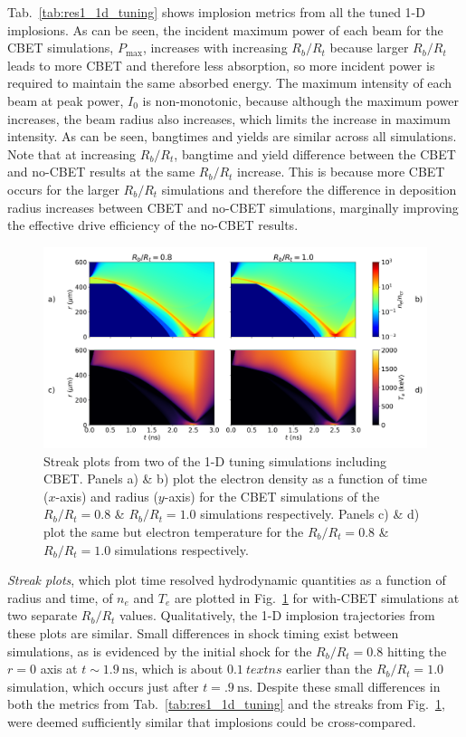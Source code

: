 Tab.~\ref{tab:res1_1d_tuning} shows implosion metrics from all the tuned 1-D implosions.
As can be seen, the incident maximum power of each beam for the \ac{CBET} simulations, $P_{\text{max}}$, increases with increasing $R_b/R_t$ because larger $R_b/R_t$ leads to more \ac{CBET} and therefore less absorption, so more incident power is required to maintain the same absorbed energy.
The maximum intensity of each beam at peak power, $I_0$ is non-monotonic, because although the maximum power increases, the beam radius also increases, which limits the increase in maximum intensity.
As can be seen, bangtimes and yields are similar across all simulations.
Note that at increasing $R_b/R_t$, bangtime and yield difference between the \ac{CBET} and no-\ac{CBET} results at the same $R_b/R_t$ increase.
This is because more \ac{CBET} occurs for the larger $R_b/R_t$ simulations and therefore the difference in deposition radius increases between \ac{CBET} and no-\ac{CBET} simulations, marginally improving the effective drive efficiency of the no-\ac{CBET} results.

\begin{figure}[t!]
    \includegraphics[width=\linewidth]{Results1/Images/streaks.png}
    \centering
    \caption{Streak plots from two of the 1-D tuning simulations including \ac{CBET}.
    Panels a) \& b) plot the electron density as a function of time ($x$-axis) and radius ($y$-axis) for the \ac{CBET} simulations of the $R_b/R_t=0.8$ \& $R_b/R_t=1.0$ simulations respectively.
    Panels c) \& d) plot the same but electron temperature for the $R_b/R_t=0.8$ \& $R_b/R_t=1.0$ simulations respectively.}%
    \label{fig:Res1_streaks}
\end{figure}

\textit{Streak plots}, which plot time resolved hydrodynamic quantities as a function of radius and time, of $n_e$ and $T_e$ are plotted in Fig.~\ref{fig:Res1_streaks} for with-\ac{CBET} simulations at two separate $R_b/R_t$ values.
Qualitatively, the 1-D implosion trajectories from these plots are similar.
Small differences in shock timing exist between simulations, as is evidenced by the initial shock for the $R_b/R_t=0.8$ hitting the $r=0$ axis at $t\sim1.9\ \text{ns}$, which is about $0.1\ text{ns}$ earlier than the $R_b/R_t=1.0$ simulation, which occurs just after $t=.9\ \text{ns}$.
Despite these small differences in both the metrics from Tab.~\ref{tab:res1_1d_tuning} and the streaks from Fig.~\ref{fig:Res1_streaks}, were deemed sufficiently similar that implosions could be cross-compared.

